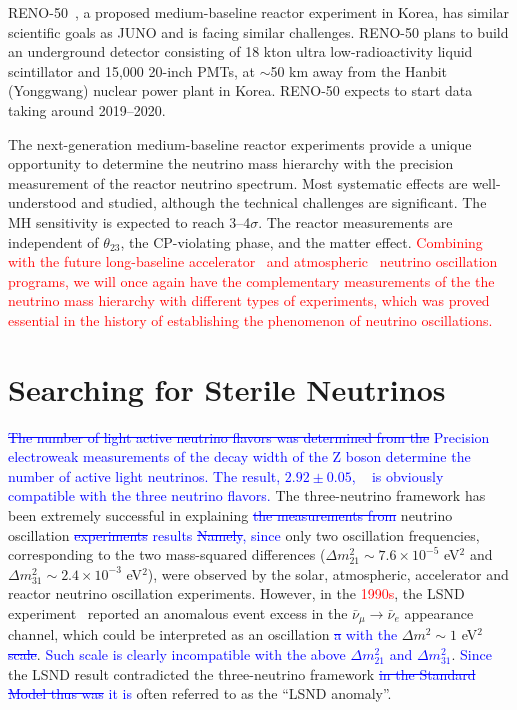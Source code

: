 \documentclass[aps,twocolumn,preprintnumbers,amsmath,superscriptaddress,amssymb,floats,nofootinbib]{revtex4-1}
\begin{document}
RENO-50~\cite{RENO-50}, a proposed medium-baseline reactor experiment in Korea, has similar scientific goals as JUNO and is facing similar challenges. RENO-50 plans to build an underground detector consisting of 18 kton ultra low-radioactivity liquid scintillator and 15,000 20-inch PMTs, at $\sim$50 km away from the Hanbit (Yonggwang) nuclear power plant in Korea. RENO-50 expects to start data taking around 2019--2020.

The next-generation medium-baseline reactor experiments provide a unique opportunity to determine the neutrino mass hierarchy with the precision measurement of the reactor neutrino spectrum.
Most systematic effects are well-understood and studied, although the technical challenges are significant. 
The MH sensitivity is expected to reach 3--4$\sigma$.
The reactor measurements are independent of $\theta_{23}$, the CP-violating phase, and the matter effect.
\textcolor{red}{Combining with the future long-baseline accelerator~\cite{LBNE} and atmospheric~\cite{PINGU,ORCA} neutrino oscillation programs, we will once again have the complementary measurements of the the neutrino mass hierarchy with different types of experiments, which was proved essential in the history of establishing the phenomenon of neutrino oscillations.}


\section{Searching for Sterile Neutrinos}

\textcolor{blue}{\st{The number of light active neutrino flavors was determined from the}} 
\textcolor{blue}{Precision electroweak measurements of the decay width of the Z boson
determine the number of active light neutrinos. The result, $2.92 \pm 0.05$,  ~\cite{EW-2005} is obviously compatible with the three neutrino flavors.}
The three-neutrino framework has been extremely successful in explaining 
\textcolor{blue}{\st{the measurements from}} neutrino oscillation \textcolor{blue}{\st{experiments} results}
\textcolor{blue}{\st{Namely}, since} only two oscillation frequencies, corresponding to the two mass-squared differences 
($\Delta m_{21}^2\sim7.6\times10^{-5}$ eV$^2$ and $\Delta m_{31}^2 \sim2.4\times10^{-3}$ eV$^2$), 
were observed by the solar, atmospheric, accelerator and reactor neutrino oscillation experiments. 
However, in the \textcolor{red}{1990s}, the LSND experiment~\cite{LSND1995,LSND2001} reported an anomalous 
event excess in the $\bar\nu_\mu\rightarrow\bar\nu_e$ appearance channel, which could be interpreted as an oscillation 
\textcolor{blue}{\st{a} with the} $\Delta m^2\sim1$ eV$^2$ \textcolor{blue}{\st{scale}}.
\textcolor{blue}{Such scale is clearly incompatible with the above $\Delta m_{21}^2$ and $\Delta m_{31}^2$}. 
\textcolor{blue}{Since} the LSND result contradicted the three-neutrino framework \textcolor{blue}{\st{in the Standard Model thus was} 
it is} often referred to as the ``LSND anomaly''.
\end{document}

